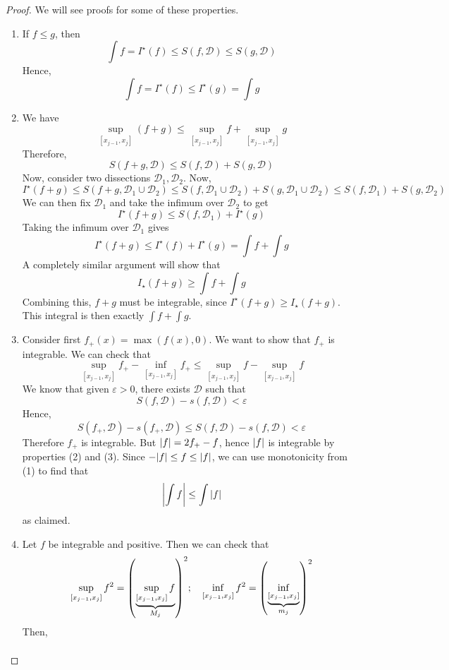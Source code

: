 \begin{proof}
	We will see proofs for some of these properties.
	\begin{enumerate}[(1)]
		\item If $f \leq g$, then
		      \[ \int f = I^\star(f) \leq S(f, \mathcal D) \leq S(g, \mathcal D) \]
		      Hence,
		      \[ \int f = I^\star(f) \leq I^\star(g) = \int g \]
		\item We have
		      \[ \sup_{[x_{j-1}, x_j]} (f + g) \leq \sup_{[x_{j-1}, x_j]} f + \sup_{[x_{j-1}, x_j]} g \]
		      Therefore,
		      \[ S(f + g, \mathcal D) \leq S(f, \mathcal D) + S(g, \mathcal D) \]
		      Now, consider two dissections $\mathcal D_1, \mathcal D_2$. Now,
		      \[ I^\star(f + g) \leq S(f + g, \mathcal D_1 \cup \mathcal D_2) \leq S(f, \mathcal D_1 \cup \mathcal D_2) + S(g, \mathcal D_1 \cup \mathcal D_2) \leq S(f, \mathcal D_1) + S(g, \mathcal D_2) \]
		      We can then fix $\mathcal D_1$ and take the infimum over $\mathcal D_2$ to get
		      \[ I^\star(f + g) \leq S(f, \mathcal D_1) + I^\star(g) \]
		      Taking the infimum over $\mathcal D_1$ gives
		      \[ I^\star(f + g) \leq I^\star(f) + I^\star(g) = \int f + \int g \]
		      A completely similar argument will show that
		      \[ I_\star(f + g) \geq \int f + \int g \]
		      Combining this, $f+g$ must be integrable, since $I^\star(f + g) \geq I_\star(f + g)$. This integral is then exactly $\int f + \int g$.
		      \setcounter{enumi}{3}
		\item Consider first $f_+(x) = \max(f(x), 0)$. We want to show that $f_+$ is integrable. We can check that
		      \[ \sup_{[x_{j-1}, x_j]}f_+ - \inf_{[x_{j-1}, x_j]}f_+ \leq \sup_{[x_{j-1}, x_j]}f - \sup_{[x_{j-1}, x_j]}f \]
		      We know that given $\varepsilon > 0$, there exists $\mathcal D$ such that
		      \[ S(f, \mathcal D) - s(f, \mathcal D) < \varepsilon \]
		      Hence,
		      \[ S(f_+, \mathcal D) - s(f_+, \mathcal D) \leq S(f, \mathcal D) - s(f, \mathcal D) < \varepsilon \]
		      Therefore $f_+$ is integrable. But $\abs{f} = 2f_+ - f$, hence $\abs{f}$ is integrable by properties (2) and (3). Since $-\abs{f} \leq f \leq \abs{f}$, we can use monotonicity from (1) to find that
		      \[ \abs{\int f} \leq \int \abs{f} \]
		      as claimed.
		\item Let $f$ be integrable and positive. Then we can check that
		      \[ \sup_{[x_{j-1}, x_j]} f^2 = \qty(\underbrace{\sup_{[x_{j-1}, x_j]} f}_{M_j})^2;\quad \inf_{[x_{j-1}, x_j]} f^2 = \qty(\underbrace{\inf_{[x_{j-1}, x_j]}}_{m_j})^2 \]
		      Then,
		      \begin{align*}

\end{align*}
\end{enumerate}
\end{proof}
